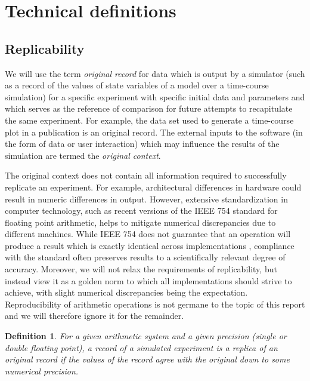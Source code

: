 \documentclass[journal,transmag]{IEEEtran}
\newtheorem{definition}{Definition}
\begin{document}
\section{Technical definitions}

\subsection{Replicability}

We will use the term \textit{original record} for data which is output
by a simulator
(such as a record of the values of state variables of a model over a time-course simulation)
for a specific experiment with specific initial data and parameters
and which serves as the reference of comparison for future attempts
to recapitulate the same experiment.
For example, the data set used to generate a time-course plot in a publication
is an original record.
The external inputs to the software (in the form of data or user interaction)
which may influence the results of the simulation are termed the \textit{original context}.

The original context does not contain all information required to successfully replicate
an experiment. For example, architectural differences in hardware could result in numeric
differences in output. However, extensive standardization in computer technology, such as recent versions
of the IEEE 754 standard for floating point arithmetic, helps to mitigate numerical discrepancies
due to different machines. While IEEE 754 does not guarantee that an operation will produce
a result which is exactly identical across implementations \cite{goldberg1991every}, compliance with the standard often
preserves results to a scientifically relevant degree of accuracy.
Moreover, we will not relax the requirements of replicability, but instead view it as a
golden norm to which all implementations should strive to achieve, with slight
numerical discrepancies being the expectation.
Reproducibility of arithmetic operations is not germane to the topic of this report and
we will therefore ignore it for the remainder.


\begin{definition}
For a given arithmetic system and a given precision (single or double floating point),
a record of a simulated experiment is a \textit{replica} of an original record if
the values of the record agree with the original down to some numerical precision.
\end{definition}
\end{document}
